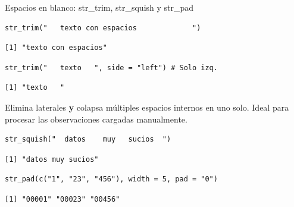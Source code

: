 \documentclass[8pt]{beamer}
\begin{document}
\begin{frame}[fragile]{Espacios en blanco: str\_trim, str\_squish y str\_pad}
\begin{lstlisting}[style=RScript]
str_trim("   texto con espacios             ")
\end{lstlisting}
\begin{lstlisting}[style=RConsole]
[1] "texto con espacios"
\end{lstlisting}
\begin{lstlisting}[style=RScript]
str_trim("   texto   ", side = "left") # Solo izq.
\end{lstlisting}
\begin{lstlisting}[style=RConsole]
[1] "texto   "
\end{lstlisting}

	Elimina laterales \textbf{y} colapsa múltiples espacios internos en uno solo. Ideal para procesar las observaciones cargadas manualmente.
\begin{lstlisting}[style=RScript]
str_squish("  datos    muy   sucios  ")
\end{lstlisting}
\begin{lstlisting}[style=RConsole]
[1] "datos muy sucios"
\end{lstlisting}

\begin{lstlisting}[style=RScript]
str_pad(c("1", "23", "456"), width = 5, pad = "0")
\end{lstlisting}
\begin{lstlisting}[style=RConsole]
[1] "00001" "00023" "00456"
\end{lstlisting}
\end{frame}
\end{document}

